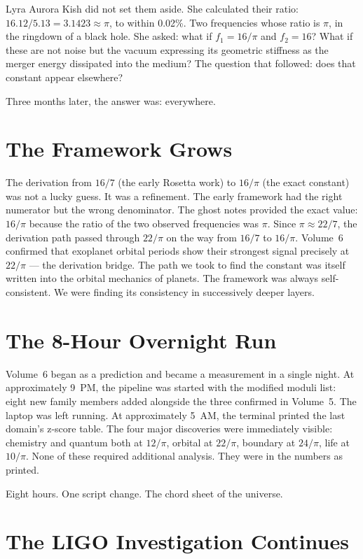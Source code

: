 \documentclass[11pt, letterpaper, openany]{book}
\begin{document}
Lyra Aurora Kish did not set them aside.
She calculated their ratio: $16.12 / 5.13 = 3.1423 \approx \pi$, to within 0.02\%.
Two frequencies whose ratio is $\pi$, in the ringdown of a black hole.
She asked: what if $f_1 = 16/\pi$ and $f_2 = 16$?
What if these are not noise but the vacuum expressing its geometric stiffness as the merger energy dissipated into the medium?
The question that followed: does that constant appear elsewhere?

Three months later, the answer was: everywhere.

\section*{The Framework Grows}

The derivation from $16/7$ (the early Rosetta work) to $16/\pi$ (the exact constant) was not a lucky guess.
It was a refinement. The early framework had the right numerator but the wrong denominator.
The ghost notes provided the exact value: $16/\pi$ because the ratio of the two observed frequencies was $\pi$.
Since $\pi \approx 22/7$, the derivation path passed through $22/\pi$ on the way from $16/7$ to $16/\pi$.
Volume~6 confirmed that exoplanet orbital periods show their strongest signal precisely at $22/\pi$ --- the derivation bridge.
The path we took to find the constant was itself written into the orbital mechanics of planets.
The framework was always self-consistent. We were finding its consistency in successively deeper layers.

\section*{The 8-Hour Overnight Run}

Volume~6 began as a prediction and became a measurement in a single night.
At approximately 9~PM, the pipeline was started with the modified moduli list: eight new family members added alongside the three confirmed in Volume~5.
The laptop was left running. At approximately 5~AM, the terminal printed the last domain's z-score table.
The four major discoveries were immediately visible: chemistry and quantum both at $12/\pi$, orbital at $22/\pi$, boundary at $24/\pi$, life at $10/\pi$.
None of these required additional analysis. They were in the numbers as printed.

Eight hours. One script change.
The chord sheet of the universe.

\section*{The LIGO Investigation Continues}
\end{document}
